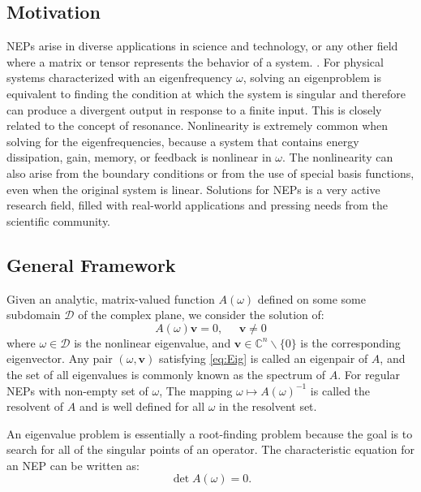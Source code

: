 \documentclass[final,leqno,onefignum,onetabnum]{siamltex1213}
\begin{document}
\subsection{Motivation}
NEPs arise in diverse applications in science and technology, or any other field where a matrix or tensor represents the behavior of a system. \citep{guillaume_nonlinear_1999, betcke2013nlevp}. For physical systems characterized with an eigenfrequency $\omega$, solving an eigenproblem is equivalent to finding the condition at which the system is singular and therefore can produce a divergent output in response to a finite input. This is closely related to the concept of resonance. Nonlinearity is extremely common when solving for the eigenfrequencies, because a system that contains energy dissipation, gain, memory, or feedback is nonlinear in $\omega$. The nonlinearity can also arise from the boundary conditions or from the use of special basis functions, even when the original system is linear. Solutions for NEPs is a very active research field, filled with real-world applications and pressing needs from the scientific community. 

\subsection{General Framework}
Given an analytic, matrix-valued function $A(\omega)$ defined on some some subdomain $\mathcal{D}$ of the complex plane, we consider the solution of:
\begin{equation}\label{eq:Eig}
    A(\omega) \mathbf{v} = 0,\;\;\;\;\;\mathbf{v}\neq 0
\end{equation}
where $\omega \in \mathcal{D}$ is the nonlinear eigenvalue, and $\mathbf{v} \in \mathbb{C}^n\backslash\{0\}$ is the corresponding eigenvector. Any pair $(\omega, \mathbf{v})$ satisfying \ref{eq:Eig} is called an eigenpair of $A$, and the set of all eigenvalues is commonly known as the spectrum of $A$. For regular NEPs with non-empty set of $\omega$, The mapping $\omega \mapsto A(\omega)^{-1}$ is called the resolvent of $A$ and is well defined for all $\omega$ in the resolvent set. 

An eigenvalue problem is essentially a root-finding problem because the goal is to search for all of the singular points of an operator. The characteristic equation for an NEP can be written as:
\begin{equation}\label{eq:charNEP}
\det A(\omega) = 0. 
\end{equation}
\end{document}
